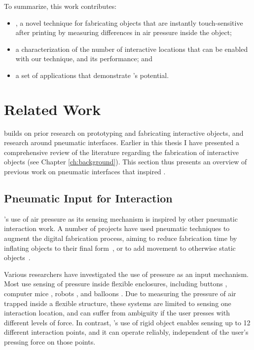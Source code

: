 		To summarize, this work contributes:
		\begin{itemize}
			\item \emph{\at}, a novel technique for fabricating objects that are
				instantly touch-sensitive after printing by measuring differences in air
				pressure inside the object;
			\item a characterization of the number of interactive locations that can
				be enabled with our technique, and its performance; and
			\item a set of applications that demonstrate \at's potential.
		\end{itemize}

	\section{Related Work}
		\at builds on prior research on prototyping and fabricating interactive
		objects, and research around pneumatic interfaces. Earlier in this thesis I
		have presented a comprehensive review of the literature regarding the
		fabrication of interactive objects (see Chapter \ref{ch:background}). This
		section thus presents an overview of previous work on pneumatic interfaces
		that inspired \at.

		\subsection{Pneumatic Input for Interaction}
			\at's use of air pressure as its sensing mechanism is inspired by other
			pneumatic interaction work. A number of projects have used pneumatic
			techniques to augment the digital fabrication process, aiming to reduce
			fabrication time by inflating objects to their final
			form~\cite{Yamaoka:2017, Sareen:2017, Ou:2016}, or to add movement to
			otherwise static objects~\cite{Niiyama:2015, Yao:2013, Niiyama:2015a}.
			
			Various researchers have investigated the use of pressure as an input
			mechanism. Most use sensing of pressure inside flexible enclosures,
			including buttons \cite{Harrison:2009, Vazquez:2015, Gohlke:2016},
			computer mice \cite{Kim:2008}, robots \cite{Slyper:2012}, and balloons
			\cite{Nakajima:2013}. Due to measuring the pressure of air trapped
			inside a flexible structure, these systems are limited to sensing one
			interaction location, and can suffer from ambiguity if the user presses
			with different levels of force. In contrast, \at's use of rigid object
			enables sensing up to 12 different interaction points, and it can operate
			reliably, independent of the user's pressing force on those points.

